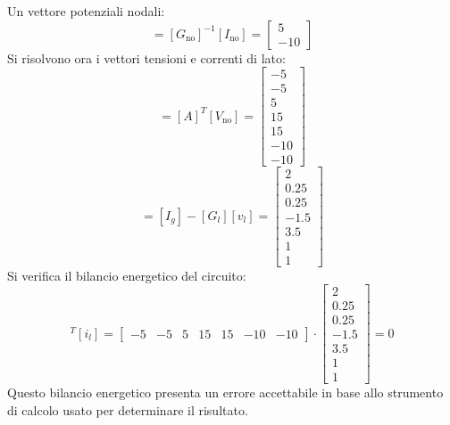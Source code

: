 \documentclass{article}
\numberwithin{equation}{subsection}
\begin{document}
Un vettore potenziali nodali:
\begin{equation*}
    [V_\mathrm{no}]=[G_\mathrm{no}]^{-1}[I_\mathrm{no}]=\begin{bmatrix}
        5\\
        -10
    \end{bmatrix}
\end{equation*}
Si risolvono ora i vettori tensioni e correnti di lato:
\begin{equation*}
    [v_l]=[A]^T[V_\mathrm{no}]=\begin{bmatrix}
        -5\\
        -5\\
        5\\
        15\\
        15\\
        -10\\
        -10
    \end{bmatrix}
\end{equation*}
\begin{equation*}
    [i_l]=[I_g]-[G_l][v_l]=\begin{bmatrix}
        2\\
        0.25\\
        0.25\\
        -1.5\\
        3.5\\
        1\\
        1
    \end{bmatrix}
\end{equation*}
Si verifica il bilancio energetico del circuito:
\begin{equation*}
    [v_l]^T[i_l]=\begin{bmatrix}
        -5&
        -5&
        5&
        15&
        15&
        -10&
        -10
    \end{bmatrix}\cdot\begin{bmatrix}
        2\\
        0.25\\
        0.25\\
        -1.5\\
        3.5\\
        1\\
        1
    \end{bmatrix}
    =0
\end{equation*}
Questo bilancio energetico presenta un errore accettabile in base allo strumento di calcolo usato per determinare il risultato. 
\end{document}
